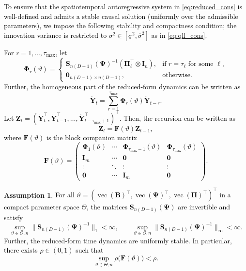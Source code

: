 \documentclass[12pt]{article}
\theoremstyle{plain}
\theoremstyle{definition}
\DeclareMathOperator{\vop}{vec}
\newcommand{\xvec}{\boldsymbol}
\newcommand{\xmat}{\mathbf}
\newtheorem{assumption}{Assumption}
\begin{document}
\textcolor{black}{To ensure that the spatiotemporal autoregressive system in \eqref{eq:reduced_cons} is well-defined and admits a stable causal solution (uniformly over the admissible parameters),} we impose the following stability and compactness condition; \textcolor{black}{the innovation variance is restricted to $\sigma^2\in[\underline\sigma^2,\overline\sigma^2]$ as in \eqref{eq:qll_cons}.} 

\textcolor{black}{For $r=1,\ldots,\tau_{\max}$, let
\[
\xmat{\Phi}_r(\vartheta)=
\begin{cases}
\xmat{S}_{n(D-1)}(\xmat{\Psi})^{-1}
(\xmat{\Pi}_\ell^\top\otimes\xmat{I}_n),
& \text{if } r=\tau_\ell \text{ for some } \ell,\\[1mm]
\xmat{0}_{n(D-1)\times n(D-1)}, & \text{otherwise}.
\end{cases}
\]
Further, the homogeneous part of the reduced-form dynamics can be written as
\[
\ddot{\xvec{Y}}_t=\sum_{r=1}^{\tau_{\max}}\xmat{\Phi}_r(\vartheta)\ddot{\xvec{Y}}_{t-r}.
\]
%
Let $\xvec{Z}_t= (\ddot{\xvec{Y}}_t^\top, \ddot{\xvec{Y}}_{t-1}^\top, \ldots, \ddot{\xvec{Y}}_{t-\tau_{\max}+1}^\top)^\top$.
%
Then, the recursion can be written as
\[
\xvec{Z}_t=\xmat{F}(\vartheta)\xvec{Z}_{t-1},
\]
where $\xmat{F}(\vartheta)$ is the block companion matrix
\[
\xmat{F}(\vartheta)=
\begin{pmatrix}
\xmat{\Phi}_1(\vartheta) & \cdots & \xmat{\Phi}_{\tau_{\max}-1}(\vartheta)& \xmat{\Phi}_{\tau_{\max}}(\vartheta)\\
\xmat{I}_m & \cdots & \xmat{0} & \xmat{0}\\
\vdots & \ddots & \vdots & \vdots\\
\xmat{0} & \cdots & \xmat{I}_m & \xmat{0}
\end{pmatrix}.
\]
}

\begin{assumption}\label{ass:stability_cons}
\textcolor{black}{
For all $\vartheta=(\vop(\xmat{B})^\top,\vop(\xmat{\Psi})^\top,\vop(\xmat{\Pi})^\top)^\top$ in a compact parameter space $\Theta$,
the matrices $\xmat{S}_{n(D-1)}(\xmat{\Psi})$ are invertible and satisfy
\[
\sup_{\vartheta\in\Theta,n}\|\xmat{S}_{n(D-1)}(\xmat{\Psi})^{-1}\|_1<\infty,
\qquad
\sup_{\vartheta\in\Theta,n}\|\xmat{S}_{n(D-1)}(\xmat{\Psi})^{-1}\|_\infty<\infty .
\]
%
Further, the reduced-form time dynamics are uniformly stable. In particular,
there exists $\rho\in(0,1)$ such that
\[
\sup_{\vartheta\in\Theta,n}
\rho\!\big(\xmat{F}(\vartheta)\big)<\rho .
\]}
\end{assumption}
\end{document}
